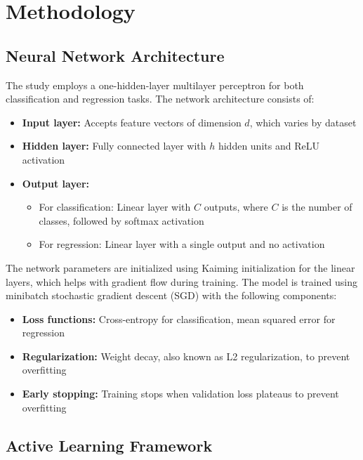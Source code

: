 \documentclass[conference]{IEEEtran}
\begin{document}
\section{Methodology}

\subsection{Neural Network Architecture}

The study employs a one-hidden-layer multilayer perceptron for both classification and regression tasks. The network architecture consists of:

\begin{itemize}
\item \textbf{Input layer:} Accepts feature vectors of dimension $d$, which varies by dataset
\item \textbf{Hidden layer:} Fully connected layer with $h$ hidden units and ReLU activation
\item \textbf{Output layer:} 
  \begin{itemize}
  \item For classification: Linear layer with $C$ outputs, where $C$ is the number of classes, followed by softmax activation
  \item For regression: Linear layer with a single output and no activation
  \end{itemize}
\end{itemize}

The network parameters are initialized using Kaiming initialization for the linear layers, which helps with gradient flow during training. The model is trained using minibatch stochastic gradient descent (SGD) with the following components:

\begin{itemize}
\item \textbf{Loss functions:} Cross-entropy for classification, mean squared error for regression
\item \textbf{Regularization:} Weight decay, also known as L2 regularization, to prevent overfitting
\item \textbf{Early stopping:} Training stops when validation loss plateaus to prevent overfitting
\end{itemize}

\subsection{Active Learning Framework}
\end{document}

